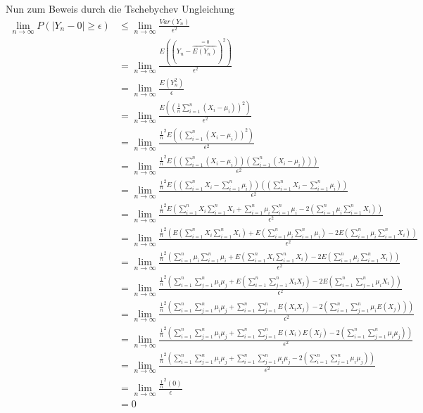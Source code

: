 \documentclass{article}
\begin{document}
Nun zum Beweis durch die Tschebychev Ungleichung
\begin{align*}
    \lim_{n \rightarrow \infty}P(|Y_n - 0| \geq \epsilon) &\leq \lim_{n \rightarrow \infty} \frac{Var(Y_n)}{\epsilon^2}\\    
    &= \lim_{n \rightarrow \infty} \frac{E((Y_n - \overbrace{E(Y_n)}^{=0})^2)}{\epsilon^2} \\
    &= \lim_{n \rightarrow \infty} \frac{E(Y_n^2)}{\epsilon} \\
    &= \lim_{n \rightarrow \infty} \frac{E((\frac{1}{n}\sum_{i=1}^{n} (X_i - \mu_i))^2)}{\epsilon^2} \\
    &= \lim_{n \rightarrow \infty} \frac{\frac{1}{n}^2 E((\sum_{i=1}^{n} (X_i - \mu_i))^2)}{\epsilon^2} \\
    &= \lim_{n \rightarrow \infty} \frac{\frac{1}{n}^2 E((\sum_{i=1}^{n} (X_i - \mu_i))(\sum_{i=1}^{n} (X_i - \mu_i)))}{\epsilon^2} \\
    &= \lim_{n \rightarrow \infty} \frac{\frac{1}{n}^2 E((\sum_{i=1}^{n}X_i - \sum_{i=1}^{n}\mu_i))((\sum_{i=1}^{n}X_i - \sum_{i=1}^{n}\mu_i))}{\epsilon^2} \\
    &= \lim_{n \rightarrow \infty} \frac{\frac{1}{n}^2 E(\sum_{i=1}^{n}X_i\sum_{i=1}^{n}X_i + \sum_{i=1}^{n}\mu_i\sum_{i=1}^{n}\mu_i - 2(\sum_{i=1}^{n}\mu_i\sum_{i=1}^{n}X_i))}{\epsilon^2} \\
    &= \lim_{n \rightarrow \infty} \frac{\frac{1}{n}^2 (E(\sum_{i=1}^{n}X_i\sum_{i=1}^{n}X_i) + E(\sum_{i=1}^{n}\mu_i\sum_{i=1}^{n}\mu_i) - 2E(\sum_{i=1}^{n}\mu_i\sum_{i=1}^{n}X_i))}{\epsilon^2} \\
    &= \lim_{n \rightarrow \infty} \frac{\frac{1}{n}^2 (\sum_{i=1}^{n}\mu_i\sum_{i=1}^{n}\mu_i + E(\sum_{i=1}^{n}X_i\sum_{i=1}^{n}X_i)  - 2E(\sum_{i=1}^{n}\mu_i\sum_{i=1}^{n}X_i))}{\epsilon^2} \\
    &= \lim_{n \rightarrow \infty} \frac{\frac{1}{n}^2 (\sum_{i=1}^{n}\sum_{j=1}^{n}\mu_i\mu_j + E(\sum_{i=1}^{n}\sum_{j=1}^{n}X_iX_j)  - 2E(\sum_{i=1}^{n}\sum_{j=1}^{n}\mu_iX_i))}{\epsilon^2} \\
    &= \lim_{n \rightarrow \infty} \frac{\frac{1}{n}^2 (\sum_{i=1}^{n}\sum_{j=1}^{n}\mu_i\mu_j + \sum_{i=1}^{n}\sum_{j=1}^{n}E(X_iX_j)  - 2(\sum_{i=1}^{n}\sum_{j=1}^{n}\mu_iE(X_j)))}{\epsilon^2} \tag*{Wegen Unabhängigkeit}\\
    &= \lim_{n \rightarrow \infty} \frac{\frac{1}{n}^2 (\sum_{i=1}^{n}\sum_{j=1}^{n}\mu_i\mu_j + \sum_{i=1}^{n}\sum_{j=1}^{n}E(X_i) E(X_j)  - 2(\sum_{i=1}^{n}\sum_{j=1}^{n}\mu_i\mu_j))}{\epsilon^2} \\
    &= \lim_{n \rightarrow \infty} \frac{\frac{1}{n}^2 (\sum_{i=1}^{n}\sum_{j=1}^{n}\mu_i\mu_j + \sum_{i=1}^{n}\sum_{j=1}^{n}\mu_i \mu_j  - 2(\sum_{i=1}^{n}\sum_{j=1}^{n}\mu_i\mu_j))}{\epsilon^2} \\
    &= \lim_{n \rightarrow \infty} \frac{\frac{1}{n}^2 (0)}{\epsilon} \\
    &=0
\end{align*}
\end{document}
